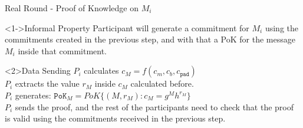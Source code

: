 \begin{frame}{Real Round - Proof of Knowledge on $M_i$}
    \begin{block}<1->{Informal Property}
        Participant will generate a commitment for $M_i$ using the commitments created in the previous step, and with that a PoK for the message $M_i$ inside that commitment.
    \end{block}
    \begin{block}<2>{Data Sending}
        $P_i$ calculates $c_M = f(c_m, c_b, c_\mathtt{pad})$\\
        $P_i$ extracts the value $r_M$ inside $c_M$ calculated before.\\
        $P_i$ generates: $\mathtt{PoK}_M = PoK\{(M, r_M): c_M = g^{M} h^{r_M}\}$\\
        $P_i$ sends the proof, and the rest of the participants need to check that the proof is valid using the commitments received in the previous step.
    \end{block}
\end{frame}